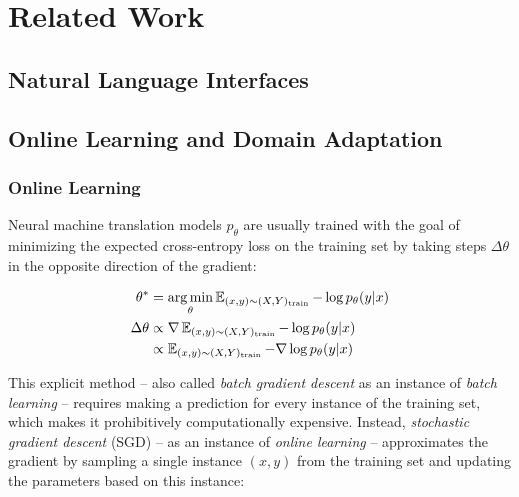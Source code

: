 \chapter{Related Work}
\label{ch:related-work}

\section{Natural Language Interfaces}




\section{Online Learning and Domain Adaptation}

\subsection{Online Learning}

Neural machine translation models \(p_{\theta}\) are usually trained with the
goal of minimizing the expected cross-entropy loss on the training set
\parencite[376]{stahlberg-2020} by taking steps \(\Delta \theta\) in the opposite
direction of the gradient:

\begin{align}
  \theta^* &= \operatorname*{arg\,min}_{\theta} \operatorname{\mathbb{E}}_{(x, y) \sim (X, Y)_{\text{train}}} -\log p_{\theta}(y|x)\\
  \Delta \theta &\propto \nabla \operatorname{\mathbb{E}}_{(x, y) \sim (X, Y)_{\text{train}}} -\log p_{\theta}(y|x)\\
  &\propto \operatorname{\mathbb{E}}_{(x, y) \sim (X, Y)_{\text{train}}} -\nabla \log p_{\theta}(y|x)
\end{align}

This explicit method – also called \emph{batch gradient descent} as an instance
of \emph{batch learning} \parencites[275]{goodfellow-2016}[100]{murphy-2021} –
requires making a prediction for every instance of the training set, which makes
it prohibitively computationally expensive. Instead, \emph{stochastic gradient
  descent} (SGD) – as an instance of \emph{online learning}
\parencites[275]{goodfellow-2016}[100]{murphy-2021} – approximates the gradient
by sampling a single instance \((x,y)\) from the training set and updating the
parameters based on this instance:

